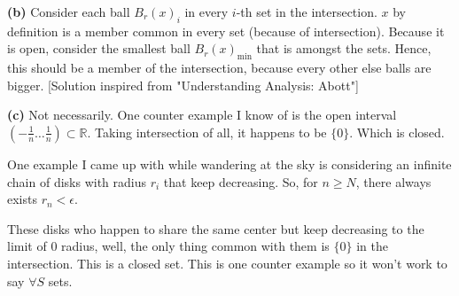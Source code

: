 \documentclass[letter]{article}
\begin{document}
\textbf{(b)} Consider each ball $B_r(x)_i$ in every $i$-th set in the intersection. $x$ by definition is a member common in every set (because of intersection). Because it is open, consider the smallest ball $B_r(x)_\text{min}$ that is amongst the sets. Hence, this should be a member of the intersection, because every other else balls are bigger. [Solution inspired from "Understanding Analysis: Abott"]

\textbf{(c)} Not necessarily. One counter example I know of is the open interval $( - \frac{1}{n} \ldots \frac{1}{n}) \subset \mathbb{R}$. Taking intersection of all, it happens to be $\{0\} $. Which is closed. 

One example I came up with while wandering at the sky is considering an infinite chain of disks with radius $r_i$ that keep decreasing. So, for $n\ge N$, there always exists $r_n < \epsilon$. 

These disks who happen to share the same center but keep decreasing to the limit of $0$ radius, well, the only thing common with them is $\{0\} $ in the intersection. This is a closed set. This is one counter example so it won't work to say $\forall S$ sets. 
\end{document}
